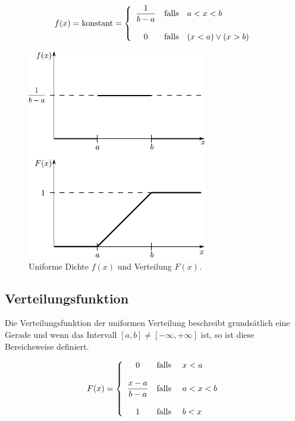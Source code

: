 \[  
	f(x) = \mathrm{konstant} = \left\{\begin{array}{c c l}
		\displaystyle \frac{1}{b-a}
			& \text{falls}
			& a < x < b \\
		& & \\
		0
			& \text{falls}
			& (x < a) \lor (x > b)
		\end{array} \right.
\]

\begin{figure}[h!]
	\centering
	\includegraphics[width=0.7\textwidth]{uniform.pdf}
	\caption{Uniforme Dichte $f(x)$ und Verteilung $F(x)$.}
	\label{fig:uniform}
\end{figure}

\subsection{Verteilungsfunktion}
Die Verteilungsfunktion der uniformen Verteilung beschreibt
grundsätlich eine Gerade und wenn das Intervall 
$[a,b]\neq[-\infty, +\infty]$ ist, so ist diese Bereichsweise
definiert.

\[  
	F(x) = \left\{
		\begin{array}{c c l}
			0 
				& \text{falls } 
				& x < a \\
			& \\
			\displaystyle
			\frac{x-a}{b-a} 
				& \text{falls } 
				& a < x < b \\
			& \\
			1
				& \text{falls } 
				& b < x
		\end{array} \right.
\]

